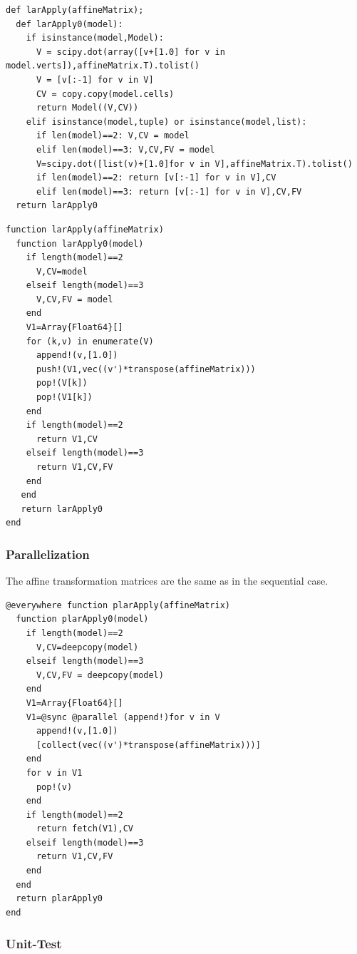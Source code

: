 \documentclass[a4paper,12pt]{article}
\begin{document}
\noindent {}
\begin{Verbatim}[fontsize=\footnotesize]
def larApply(affineMatrix);
  def larApply0(model):
    if isinstance(model,Model):
      V = scipy.dot(array([v+[1.0] for v in model.verts]),affineMatrix.T).tolist()
      V = [v[:-1] for v in V]
      CV = copy.copy(model.cells)
      return Model((V,CV))
    elif isinstance(model,tuple) or isinstance(model,list):
      if len(model)==2: V,CV = model
      elif len(model)==3: V,CV,FV = model
      V=scipy.dot([list(v)+[1.0]for v in V],affineMatrix.T).tolist()
      if len(model)==2: return [v[:-1] for v in V],CV
      elif len(model)==3: return [v[:-1] for v in V],CV,FV
  return larApply0
\end{Verbatim}

\noindent {}
\begin{Verbatim}[fontsize=\footnotesize]
function larApply(affineMatrix)
  function larApply0(model)
    if length(model)==2
      V,CV=model
    elseif length(model)==3
      V,CV,FV = model
    end
    V1=Array{Float64}[]
    for (k,v) in enumerate(V)
      append!(v,[1.0])
      push!(V1,vec((v')*transpose(affineMatrix)))
      pop!(V[k])
      pop!(V1[k])
    end
    if length(model)==2
      return V1,CV
    elseif length(model)==3
      return V1,CV,FV
    end
   end 
   return larApply0
end
\end{Verbatim}
\subsubsection{Parallelization}
The affine transformation matrices are the same as in the sequential case.

\begin{Verbatim}[fontsize=\footnotesize]
@everywhere function plarApply(affineMatrix)
  function plarApply0(model)
    if length(model)==2
      V,CV=deepcopy(model)
    elseif length(model)==3
      V,CV,FV = deepcopy(model)
    end
    V1=Array{Float64}[]
    V1=@sync @parallel (append!)for v in V
      append!(v,[1.0])
      [collect(vec((v')*transpose(affineMatrix)))]
    end
    for v in V1
      pop!(v)
    end
    if length(model)==2
      return fetch(V1),CV
    elseif length(model)==3
      return V1,CV,FV
    end
  end
  return plarApply0
end
\end{Verbatim}
\subsubsection{Unit-Test}
\end{document}
